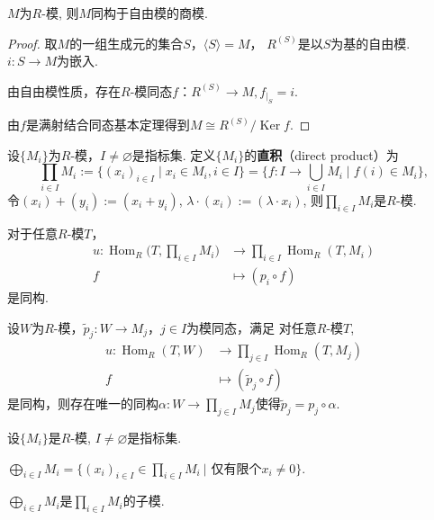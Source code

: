	\begin{proposition} 
		$M$为$R$-模, 则$M$同构于自由模的商模.
	\end{proposition}
\begin{proof}
	取$M$的一组生成元的集合$S$，$\langle S\rangle=M$，
    $R^{(S)}$是以$S$为基的自由模. $i:S\rightarrow M$为嵌入.
	
	由自由模性质，存在$R$-模同态$f$：$R^{(S)}\rightarrow M,f_{|_S}=i$.
	
	由$f$是满射结合同态基本定理得到$M\cong  R^{(S)}/\operatorname{Ker}f$.
\end{proof}
	\begin{definition}
		设$\{M_i\}$为$R$-模，$I\neq \varnothing$是指标集.
        定义$\{M_i\}$的\textbf{直积}（direct product）为
		$$\prod_{i\in I} M_i:=\{(x_i)_{i\in I}\mid x_i\in M_i, i\in I\}
        =\{f: I\rightarrow \bigcup_{i\in I} M_i\mid f(i)\in M_i\},$$
		令$(x_i)+(y_i):=(x_i+y_i)$, $\lambda\cdot (x_i):=(\lambda \cdot x_i)$, 
        则$\prod\limits_{i\in I} M_i$是$R$-模.
	\end{definition}
	
	\begin{proposition}
		对于任意$R$-模$T$，\begin{align*}
			u: \operatorname{Hom}_R\Big(T,\prod\limits_{i\in I} M_i\Big) 
            &\rightarrow \prod\limits_{i\in I} \operatorname{Hom}_R(T, M_i)\\
			f &\mapsto (p_i\circ f)
		\end{align*} 是同构.
	
	\end{proposition}
	
	\begin{proposition}
		设$W$为$R$-模，$\tilde{p}_j: W\rightarrow M_j$，$j\in I$为模同态，满足
        对任意$R$-模$T$, 
			\begin{align*}
				u: \operatorname{Hom}_R(T,W) &\rightarrow \prod\limits_{j\in I} \operatorname{Hom}_R(T, M_j)\\
					f &\mapsto (\tilde{p}_j\circ f)
				\end{align*} 是同构，则存在唯一的同构$\alpha:W\rightarrow \prod\limits_{j\in I} M_j$使得$\tilde{p}_j=p_j\circ \alpha$.
	
	\end{proposition}
	
	\begin{definition}
		设$\{M_i\}$是$R$-模, $I\neq \varnothing$是指标集.\par
		\qquad $\bigoplus\limits_{i\in I} M_i=\{(x_i)_{i\in I} \in \prod\limits_{i\in I} M_i\ \big|$ 仅有限个$x_i\neq0\}$.\par
		\qquad $\bigoplus\limits_{i\in I} M_i$是$\prod\limits_{i\in I} M_i$的子模.
	\end{definition}
	

